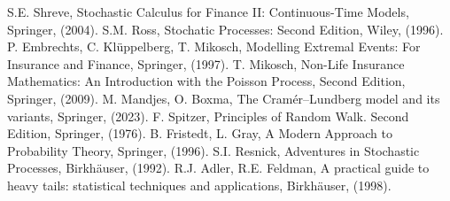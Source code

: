 \documentclass[12pt, a4paper, reqno]{amsart}
\theoremstyle{definition}
\theoremstyle{plain}
\newcommand{\1}{\mathds{1}}
\begin{document}
\begin{thebibliography}{99}
S.E. Shreve, Stochastic Calculus for Finance II: Continuous-Time Models, Springer, (2004).
S.M. Ross, Stochatic Processes: Second Edition, Wiley, (1996).
P. Embrechts, C. Klüppelberg, T. Mikosch, Modelling Extremal Events: For Insurance and Finance, Springer, (1997).
T. Mikosch, Non-Life Insurance Mathematics: An Introduction with the Poisson Process, Second Edition, Springer, (2009).
M. Mandjes, O. Boxma, The Cramér--Lundberg model and its variants, Springer, (2023).
F. Spitzer, Principles of Random Walk. Second Edition, Springer, (1976).
B. Fristedt, L. Gray, A Modern Approach to Probability Theory, Springer, (1996).
S.I. Resnick, Adventures in Stochastic Processes, Birkhäuser, (1992).
R.J. Adler, R.E. Feldman, A practical guide to heavy tails: statistical techniques and applications, Birkhäuser, (1998).
\end{thebibliography}
\end{document}
